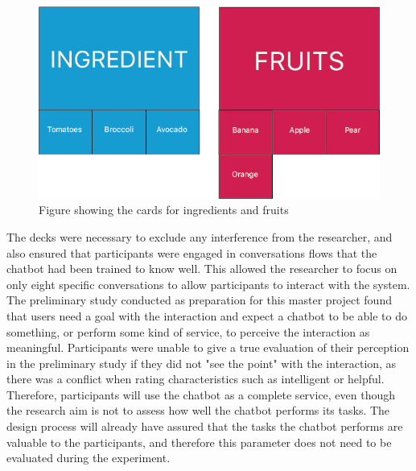      \begin{figure}[h]
            \centering
            \includegraphics[scale=0.5]{figures/Ingredientfruit.png}
            \caption{Figure showing the cards for ingredients and fruits}
            \label{fig:ingfruit}
        \end{figure}

   The decks were necessary to exclude any interference from the researcher, and also ensured that participants were engaged in conversations flows that the chatbot had been trained to know well. This allowed the researcher to focus on only eight specific conversations to allow participants to interact with the system. The preliminary study conducted as preparation for this master project found that users need a goal with the interaction and expect a chatbot to be able to do something, or perform some kind of service, to perceive the interaction as meaningful. Participants were unable to give a true evaluation of their perception in the preliminary study if they did not "see the point" with the interaction, as there was a conflict when rating characteristics such as intelligent or helpful. Therefore, participants will use the chatbot as a complete service, even though the research aim is not to assess how well the chatbot performs its tasks. The design process will already have assured that the tasks the chatbot performs are valuable to the participants, and therefore this parameter does not need to be evaluated during the experiment.
   
